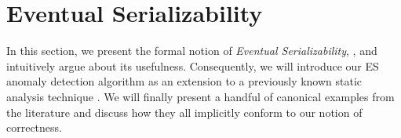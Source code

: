 \documentclass{vldb}
\begin{document}
\author{
%
%
\alignauthor
Ben Trovato\\
       \\
       \\
       \\
\alignauthor
G.K.M. Tobin\\
       \\
       \\
       \\
}
\additionalauthors{}

\date{30 July 1999}




\section{Eventual Serializability}
In this section, we present the formal notion of \emph{Eventual
Serializability}, \es, and intuitively argue about its usefulness. Consequently, we
will introduce our ES anomaly detection algorithm as an extension to a previously known static
analysis technique \cite{Nagar:ser}. We will finally
present a handful of canonical examples from the literature and discuss how they all
implicitly conform to our notion of correctness.
\end{document}
